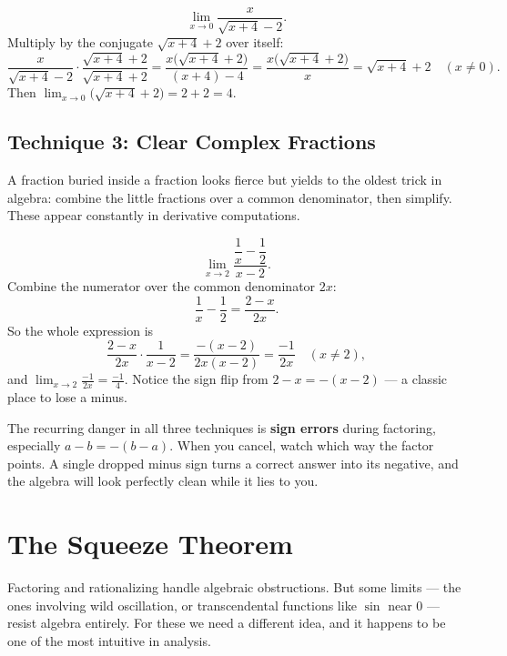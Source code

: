 \begin{example}
\label{ch07:ex-rat2}
\[
  \lim_{x\to 0}\frac{x}{\sqrt{x+4}-2}.
\]
Multiply by the conjugate $\sqrt{x+4}+2$ over itself:
\[
  \frac{x}{\sqrt{x+4}-2}\cdot\frac{\sqrt{x+4}+2}{\sqrt{x+4}+2}
  = \frac{x\big(\sqrt{x+4}+2\big)}{(x+4)-4}
  = \frac{x\big(\sqrt{x+4}+2\big)}{x}
  = \sqrt{x+4}+2 \quad (x\neq 0).
\]
Then $\displaystyle\lim_{x\to 0}\big(\sqrt{x+4}+2\big) = 2+2 = 4.$
\end{example}

\subsection{Technique 3: Clear Complex Fractions}
\label{ch07:complexfrac}

A fraction buried inside a fraction looks fierce but yields to the oldest
trick in algebra: combine the little fractions over a common denominator, then
simplify. These appear constantly in derivative computations.

\begin{example}
\label{ch07:ex-complex}
\[
  \lim_{x\to 2}\frac{\dfrac{1}{x}-\dfrac{1}{2}}{x-2}.
\]
Combine the numerator over the common denominator $2x$:
\[
  \frac{1}{x}-\frac{1}{2} = \frac{2-x}{2x}.
\]
So the whole expression is
\[
  \frac{2-x}{2x}\cdot\frac{1}{x-2}
  = \frac{-(x-2)}{2x(x-2)}
  = \frac{-1}{2x} \quad (x\neq 2),
\]
and $\displaystyle\lim_{x\to 2}\frac{-1}{2x} = \frac{-1}{4}.$ Notice the sign
flip from $2-x = -(x-2)$ --- a classic place to lose a minus.
\end{example}

\begin{trapbox}
The recurring danger in all three techniques is \textbf{sign errors} during
factoring, especially $a-b = -(b-a)$. When you cancel, watch which way the
factor points. A single dropped minus sign turns a correct answer into its
negative, and the algebra will look perfectly clean while it lies to you.
\end{trapbox}

\section{The Squeeze Theorem}
\label{ch07:squeeze}

Factoring and rationalizing handle algebraic obstructions. But some limits ---
the ones involving wild oscillation, or transcendental functions like $\sin$
near $0$ --- resist algebra entirely. For these we need a different idea, and
it happens to be one of the most intuitive in analysis.

